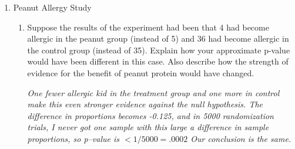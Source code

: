 \begin{enumerate}

    
\item Peanut Allergy Study
  \begin{enumerate}
  \item  Suppose the results of the experiment had been that 4 had
    become allergic in the peanut group (instead of 5) and  36 had
    become allergic in the control group (instead of 35).  Explain how your
    approximate p-value would have been different in this case.  Also
    describe how the strength of evidence for the benefit of peanut protein
    would have changed.
\begin{students}
  \vspace{2cm}
\end{students}  

\begin{key}
  {\it  One fewer allergic kid in the treatment group and one more
     in control make this even stronger evidence against the null
     hypothesis. The difference in proportions becomes -0.125, and in 5000
     randomization trials, I never got one sample with this large a
     difference in sample proportions, so p--value is $< 1/5000 =
     .0002$  Our conclusion is the same.
  }
\end{key}


\end{enumerate}
\end{enumerate}
